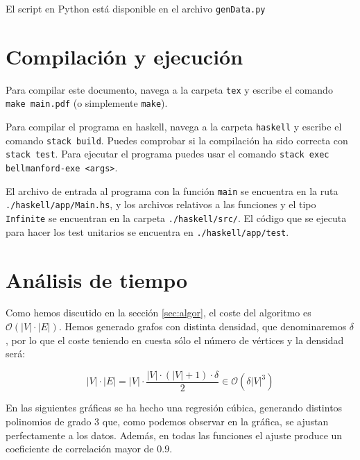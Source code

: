 \documentclass{article}
\begin{document}
El script en Python está disponible en el archivo \texttt{genData.py}

\section{Compilación y ejecución}
Para compilar este documento, navega a la carpeta \texttt{tex} y escribe el comando \texttt{make main.pdf} (o simplemente \texttt{make}).

Para compilar el programa en haskell, navega a la carpeta \texttt{haskell} y escribe el comando \texttt{stack build}. Puedes comprobar si la compilación ha sido correcta con \texttt{stack test}.
Para ejecutar el programa puedes usar el comando \texttt{stack exec bellmanford-exe <args>}.

El archivo de entrada al programa con la función \texttt{main} se encuentra en la ruta \texttt{./haskell/app/Main.hs}, y los archivos relativos a las funciones y el tipo \texttt{Infinite} se encuentran en la carpeta \texttt{./haskell/src/}. El código que se ejecuta para hacer los test unitarios se encuentra en \texttt{./haskell/app/test}.

\newpage
\section{Análisis de tiempo}
Como hemos discutido en la sección \ref{sec:algor}, el coste del algoritmo es $\mathcal{O}\left(|V|\cdot |E|\right)$. Hemos generado grafos con distinta densidad, que denominaremos $\delta$, por lo que el coste teniendo en cuesta sólo el número de vértices y la densidad será:

$$|V|\cdot |E| = |V|\cdot \frac{|V|\cdot(|V|+1)\cdot\delta}{2}\in \mathcal{O}\left(\delta|V|^3\right)$$

En las siguientes gráficas se ha hecho una regresión cúbica, generando distintos polinomios de grado 3 que, como podemos observar en la gráfica, se ajustan perfectamente a los datos. Además, en todas las funciones el ajuste produce un coeficiente de correlación mayor de $0.9$.
\end{document}
